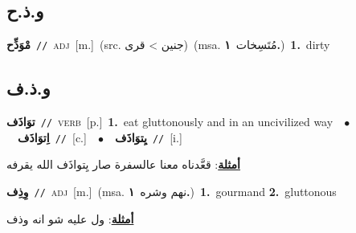 \documentclass[10pt,a4paper,twoside]{article} %
\begin{document}
\begin{multicols}{2}
\vspace{-3mm}
\subsection*{\color{blue}\foreignlanguage{arabic}{و.ذ.ح}\color{blue}{}} 

{\setlength\topsep{0pt}\textbf{\foreignlanguage{arabic}{مْوَذِّح}}\ {\color{gray}\texttt{//}\color{black}}\ \textsc{adj}\ [m.]\ (src. \color{gray}\foreignlanguage{arabic}{جنين > قرى}\color{black})\ \color{gray}(msa. \foreignlanguage{arabic}{مُتَسِخات}~\foreignlanguage{arabic}{\textbf{١.}})\color{black}\ \textbf{1.}~dirty\ } \vspace{2mm}

\vspace{-3mm}
\subsection*{\color{blue}\foreignlanguage{arabic}{و.ذ.ف}\color{blue}{}} 

{\setlength\topsep{0pt}\textbf{\foreignlanguage{arabic}{توَاذَف}}\ {\color{gray}\texttt{//}\color{black}}\ \textsc{verb}\ [p.]\ \textbf{1.}~eat gluttonously and in an uncivilized way\ \ $\bullet$\ \ \setlength\topsep{0pt}\textbf{\foreignlanguage{arabic}{اِتوَاذَف}}\ {\color{gray}\texttt{//}\color{black}}\ [c.]\ \ $\bullet$\ \ \setlength\topsep{0pt}\textbf{\foreignlanguage{arabic}{يِتوَاذَف}}\ {\color{gray}\texttt{//}\color{black}}\ [i.]\  \begin{flushright}\color{gray}\foreignlanguage{arabic}{\textbf{\underline{\foreignlanguage{arabic}{أمثلة}}}: قعَّدناه معنا عالسفرة صار يِتواذَف الله يقرفه}\end{flushright}\color{black}} \vspace{2mm}

{\setlength\topsep{0pt}\textbf{\foreignlanguage{arabic}{وِذِف}}\ {\color{gray}\texttt{//}\color{black}}\ \textsc{adj}\ [m.]\ \color{gray}(msa. \foreignlanguage{arabic}{نهم وشره}~\foreignlanguage{arabic}{\textbf{١.}})\color{black}\ \textbf{1.}~gourmand  \textbf{2.}~gluttonous\  \begin{flushright}\color{gray}\foreignlanguage{arabic}{\textbf{\underline{\foreignlanguage{arabic}{أمثلة}}}: ول عليه شو انه وذف}\end{flushright}\color{black}} \vspace{2mm}


\end{multicols}
\end{document}
